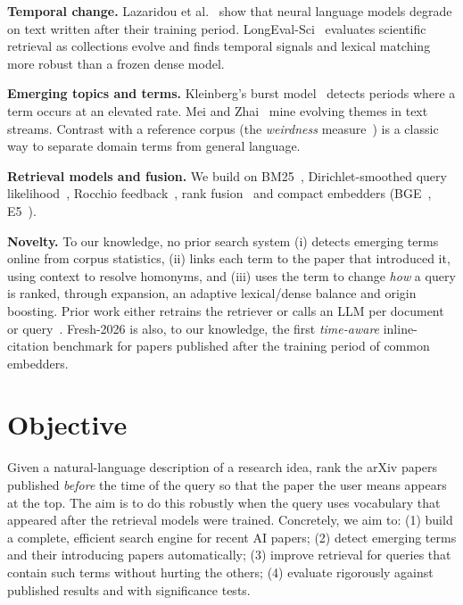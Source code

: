 \documentclass[10pt,twocolumn]{article}
\begin{document}
\textbf{Temporal change.} Lazaridou et al.~\cite{lazaridou2021} show that neural
language models degrade on text written after their training period.
LongEval-Sci~\cite{longeval2026} evaluates scientific retrieval as collections evolve
and finds temporal signals and lexical matching more robust than a frozen dense
model.

\textbf{Emerging topics and terms.} Kleinberg's burst model~\cite{kleinberg2002}
detects periods where a term occurs at an elevated rate. Mei and
Zhai~\cite{mei2005} mine evolving themes in text streams. Contrast with a reference
corpus (the \emph{weirdness} measure~\cite{ahmad1999}) is a classic way to separate
domain terms from general language.

\textbf{Retrieval models and fusion.} We build on BM25~\cite{robertson2009},
Dirichlet-smoothed query likelihood~\cite{zhai2001}, Rocchio
feedback~\cite{manning2008}, rank fusion~\cite{cormack2009} and compact embedders
(BGE~\cite{xiao2024}, E5~\cite{wang2022}).

\textbf{Novelty.} To our knowledge, no prior search system (i) detects emerging terms
online from corpus statistics, (ii) links each term to the paper that introduced it,
using context to resolve homonyms, and (iii) uses the term to change \emph{how} a
query is ranked, through expansion, an adaptive lexical/dense balance and origin
boosting. Prior work either retrains the retriever or calls an LLM per document or
query~\cite{hu2026,he2025}. Fresh-2026 is also, to our knowledge, the first
\emph{time-aware} inline-citation benchmark for papers published after the training
period of common embedders.

\section{Objective}
Given a natural-language description of a research idea, rank the arXiv papers
published \emph{before} the time of the query so that the paper the user means
appears at the top. The aim is to do this robustly when the query uses vocabulary
that appeared after the retrieval models were trained. Concretely, we aim to:
(1) build a complete, efficient search engine for recent AI papers;
(2) detect emerging terms and their introducing papers automatically;
(3) improve retrieval for queries that contain such terms without hurting the others;
(4) evaluate rigorously against published results and with significance tests.
\end{document}
